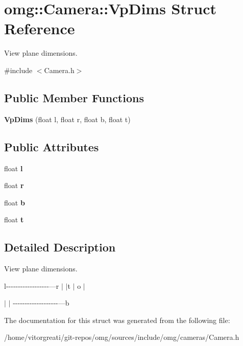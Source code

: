 \hypertarget{structomg_1_1_camera_1_1_vp_dims}{}\section{omg\+::Camera\+::Vp\+Dims Struct Reference}
\label{structomg_1_1_camera_1_1_vp_dims}


View plane dimensions.  




{\ttfamily \#include $<$Camera.\+h$>$}

\subsection*{Public Member Functions}
\begin{DoxyCompactItemize}
\item 
\mbox{\label{structomg_1_1_camera_1_1_vp_dims_a39f1dfe0b5e07e80ef105231b08a40cf}} 
{\bfseries Vp\+Dims} (float l, float r, float b, float t)
\end{DoxyCompactItemize}
\subsection*{Public Attributes}
\begin{DoxyCompactItemize}
\item 
\mbox{\label{structomg_1_1_camera_1_1_vp_dims_a088c428da6b01d87a89a0a0d65c4f8f3}} 
float {\bfseries l}
\item 
\mbox{\label{structomg_1_1_camera_1_1_vp_dims_afa389e8df5965344096b061a9c2efddf}} 
float {\bfseries r}
\item 
\mbox{\label{structomg_1_1_camera_1_1_vp_dims_aec55b5034c81a789d278e55b962cdc6f}} 
float {\bfseries b}
\item 
\mbox{\label{structomg_1_1_camera_1_1_vp_dims_aa3608e6e423e716adfee9ea46c5dd28e}} 
float {\bfseries t}
\end{DoxyCompactItemize}


\subsection{Detailed Description}
View plane dimensions. 

l-\/-\/-\/-\/-\/-\/-\/-\/-\/-\/-\/-\/-\/-\/-\/-\/-\/-\/---r $\vert$ $\vert$t $\vert$ o $\vert$

$\vert$ $\vert$ -\/-\/-\/-\/-\/-\/-\/-\/-\/-\/-\/-\/-\/-\/-\/-\/-\/-\/-\/---b 

The documentation for this struct was generated from the following file\+:\begin{DoxyCompactItemize}
\item 
/home/vitorgreati/git-\/repos/omg/sources/include/omg/cameras/Camera.\+h\end{DoxyCompactItemize}
